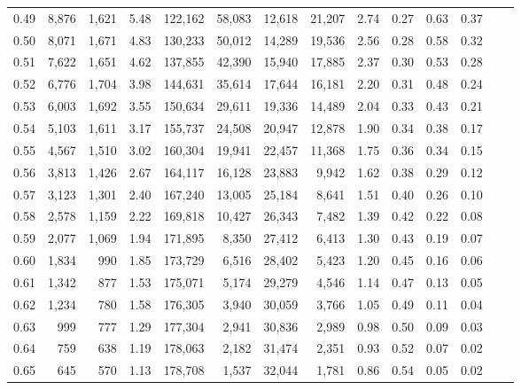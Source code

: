 \begin{tabular}{rrrrrrrrrrrrrr}
0.49 &  8,876 &  1,621 &    5.48 &  122,162 &   58,083 &  12,618 &  21,207 &  2.74 &  0.27 &  0.63 &      0.37 \\
0.50 &  8,071 &  1,671 &    4.83 &  130,233 &   50,012 &  14,289 &  19,536 &  2.56 &  0.28 &  0.58 &      0.32 \\
0.51 &  7,622 &  1,651 &    4.62 &  137,855 &   42,390 &  15,940 &  17,885 &  2.37 &  0.30 &  0.53 &      0.28 \\
0.52 &  6,776 &  1,704 &    3.98 &  144,631 &   35,614 &  17,644 &  16,181 &  2.20 &  0.31 &  0.48 &      0.24 \\
0.53 &  6,003 &  1,692 &    3.55 &  150,634 &   29,611 &  19,336 &  14,489 &  2.04 &  0.33 &  0.43 &      0.21 \\
0.54 &  5,103 &  1,611 &    3.17 &  155,737 &   24,508 &  20,947 &  12,878 &  1.90 &  0.34 &  0.38 &      0.17 \\
0.55 &  4,567 &  1,510 &    3.02 &  160,304 &   19,941 &  22,457 &  11,368 &  1.75 &  0.36 &  0.34 &      0.15 \\
0.56 &  3,813 &  1,426 &    2.67 &  164,117 &   16,128 &  23,883 &   9,942 &  1.62 &  0.38 &  0.29 &      0.12 \\
0.57 &  3,123 &  1,301 &    2.40 &  167,240 &   13,005 &  25,184 &   8,641 &  1.51 &  0.40 &  0.26 &      0.10 \\
0.58 &  2,578 &  1,159 &    2.22 &  169,818 &   10,427 &  26,343 &   7,482 &  1.39 &  0.42 &  0.22 &      0.08 \\
0.59 &  2,077 &  1,069 &    1.94 &  171,895 &    8,350 &  27,412 &   6,413 &  1.30 &  0.43 &  0.19 &      0.07 \\
0.60 &  1,834 &    990 &    1.85 &  173,729 &    6,516 &  28,402 &   5,423 &  1.20 &  0.45 &  0.16 &      0.06 \\
0.61 &  1,342 &    877 &    1.53 &  175,071 &    5,174 &  29,279 &   4,546 &  1.14 &  0.47 &  0.13 &      0.05 \\
0.62 &  1,234 &    780 &    1.58 &  176,305 &    3,940 &  30,059 &   3,766 &  1.05 &  0.49 &  0.11 &      0.04 \\
0.63 &    999 &    777 &    1.29 &  177,304 &    2,941 &  30,836 &   2,989 &  0.98 &  0.50 &  0.09 &      0.03 \\
0.64 &    759 &    638 &    1.19 &  178,063 &    2,182 &  31,474 &   2,351 &  0.93 &  0.52 &  0.07 &      0.02 \\
0.65 &    645 &    570 &    1.13 &  178,708 &    1,537 &  32,044 &   1,781 &  0.86 &  0.54 &  0.05 &      0.02 \\

\end{tabular}
